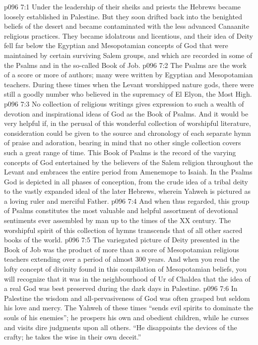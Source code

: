 \vs p096 7:1 Under the leadership of their sheiks and priests the Hebrews became loosely established in Palestine. But they soon drifted back into the benighted beliefs of the desert and became contaminated with the less advanced Canaanite religious practices. They became idolatrous and licentious, and their idea of Deity fell far below the Egyptian and Mesopotamian concepts of God that were maintained by certain surviving Salem groups, and which are recorded in some of the Psalms and in the so\hyp{}called Book of Job.
\vs p096 7:2 \pc The Psalms are the work of a score or more of authors; many were written by Egyptian and Mesopotamian teachers. During these times when the Levant worshipped nature gods, there were still a goodly number who believed in the supremacy of El Elyon, the Most High.
\vs p096 7:3 No collection of religious writings gives expression to such a wealth of devotion and inspirational ideas of God as the Book of Psalms. And it would be very helpful if, in the perusal of this wonderful collection of worshipful literature, consideration could be given to the source and chronology of each separate hymn of praise and adoration, bearing in mind that no other single collection covers such a great range of time. This Book of Psalms is the record of the varying concepts of God entertained by the believers of the Salem religion throughout the Levant and embraces the entire period from Amenemope to Isaiah. In the Psalms God is depicted in all phases of conception, from the crude idea of a tribal deity to the vastly expanded ideal of the later Hebrews, wherein Yahweh is pictured as a loving ruler and merciful Father.
\vs p096 7:4 And when thus regarded, this group of Psalms constitutes the most valuable and helpful assortment of devotional sentiments ever assembled by man up to the times of the XX century. The worshipful spirit of this collection of hymns transcends that of all other sacred books of the world.
\vs p096 7:5 \pc The variegated picture of Deity presented in the Book of Job was the product of more than a score of Mesopotamian religious teachers extending over a period of almost 300 years. And when you read the lofty concept of divinity found in this compilation of Mesopotamian beliefs, you will recognize that it was in the neighbourhood of Ur of Chaldea that the idea of a real God was best preserved during the dark days in Palestine.
\vs p096 7:6 In Palestine the wisdom and all\hyp{}pervasiveness of God was often grasped but seldom his love and mercy. The Yahweh of these times “sends evil spirits to dominate the souls of his enemies”; he prospers his own and obedient children, while he curses and visits dire judgments upon all others. “He disappoints the devices of the crafty; he takes the wise in their own deceit.”

